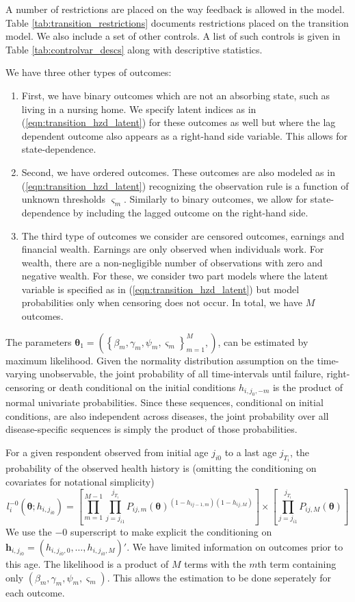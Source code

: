 A number of restrictions are placed on the way feedback is allowed in the model.  
Table \ref{tab:transition_restrictions} documents restrictions placed on the 
transition model. We also include a set of other controls. A list of such controls 
is given in Table \ref{tab:controlvar_descs} along with descriptive statistics. 

We have three other types of outcomes:
\begin{enumerate}
\item First, we have binary outcomes which are not an absorbing state, such as living in a nursing home. We specify latent 
indices as in (\ref{eqn:transition_hzd_latent}) for these outcomes as well but where 
the lag dependent outcome also appears as a right-hand side variable. This allows for state-dependence. 

\item Second, we have ordered outcomes. These outcomes are also modeled as in (\ref{eqn:transition_hzd_latent}) recognizing the observation rule is 
a function of unknown thresholds $\varsigma_m$. Similarly to binary outcomes, we allow for state-dependence by including the lagged outcome 
on the right-hand side.

\item The third type of outcomes we consider are censored outcomes, earnings and financial wealth. Earnings are only observed when individuals 
work. For wealth, there are a non-negligible number of observations with zero and negative wealth. For these, we consider two part models 
where the latent variable is specified as in (\ref{eqn:transition_hzd_latent}) but model probabilities only when censoring does not occur. In 
total, we have $M$ outcomes.
\end{enumerate}

The parameters 
$\mathbf{\theta}_1 = \left(\left\{\beta_m, \gamma_m, \psi_m, \varsigma_m\right\}_{m=1}^M, \right)$, 
can be estimated by maximum likelihood. Given the normality distribution assumption on the 
time-varying unobservable, the joint probability of all time-intervals until failure, right-censoring 
or death conditional on the initial conditions $h_{i,j_0,-m}$ is the product of 
normal univariate probabilities. Since these sequences, conditional on initial 
conditions, are also independent across diseases, the joint 
probability over all disease-specific sequences is simply the product of 
those probabilities. 

For a given respondent observed from initial age $j_{i0}$ to a last age $j_{T_i}$, the probability of the observed health history is 
(omitting the conditioning on covariates for notational simplicity)
\[
	l^{-0}_i(\mathbf{\theta}; h_{i,j_{i0}}) = \left[\prod_{m=1}^{M-1} \prod_{j=j_{i1}}^{j_{T_i}} P_{ij,m}(\mathbf{\theta})^{(1-h_{ij-1,m})(1-h_{ij,M})} \right] \times \left[\prod_{j=j_{i1}}^{j_{T_i}} P_{ij,M}(\mathbf{\theta}) \right]
\]
We use the ${-0}$ superscript to make explicit the conditioning on $\mathbf{h}_{i,j_{i0}} = (h_{i,j_{i0},0},\ldots,h_{i,j_{i0},M})'$. We have limited information on outcomes prior to this age. 
The likelihood is a product of $M$ terms with the $m$th term containing only 
$(\beta_m, \gamma_m, \psi_m, \varsigma_m)$.  This allows the estimation
to be done seperately for each outcome.

